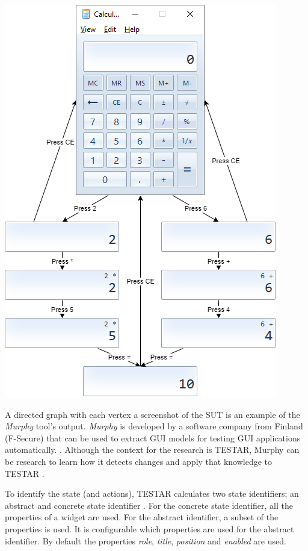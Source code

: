 \begingroup
\captionsetup{type=figure}
\includegraphics[scale=0.5]{pics/calc-state-example.png}
\label{fig:state-example}
\endgroup

A directed graph with each vertex a screenshot of the SUT is an example of the \emph{Murphy} tool's output. \emph{Murphy} is developed by a software company from Finland (F-Secure) that can be used to extract GUI models for testing GUI applications automatically. \cite{aho2013industrial}. Although the context for the research is TESTAR, Murphy can be research to learn how it detects changes and apply that knowledge to TESTAR \cite{murphy-extract-gui}.

To identify the state (and actions), TESTAR calculates two state identifiers; an abstract and concrete state identifier \cite{thesisMulders}. For the concrete state identifier, all the properties of a widget are used. For the abstract identifier, a subset of the properties is used. It is configurable which properties are used for the abstract identifier. By default the properties \textit{role}, \textit{title}, \textit{position} and \textit{enabled} are used.

